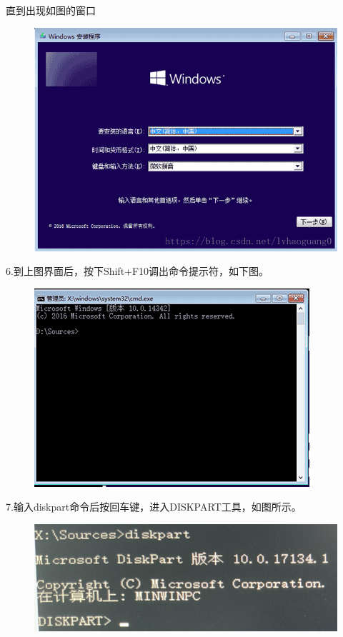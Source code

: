 \documentclass[openbib]{article}
\begin{document}
直到出现如图的窗口
\begin{figure}[htbp]
	\centering
	\includegraphics[scale=0.3]{6}
\end{figure}

6.到上图界面后，按下Shift+F10调出命令提示符，如下图。
\begin{figure}[htbp]
	\centering
	\includegraphics[scale=0.25]{7}
\end{figure}

7.输入diskpart命令后按回车键，进入DISKPART工具，如图所示。
\begin{figure}[htbp]
	\centering
	\includegraphics[scale=0.25]{8}
\end{figure}
\end{document}
